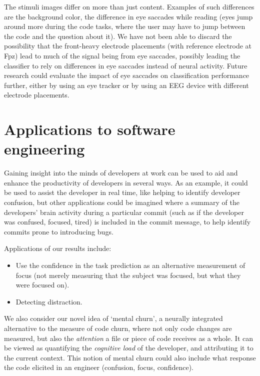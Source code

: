     The stimuli images differ on more than just content. Examples of such differences are the background color, the difference in eye saccades while reading (eyes jump around more during the code tasks, where the user may have to jump between the code and the question about it). We have not been able to discard the possibility that the front-heavy electrode placements (with reference electrode at Fpz) lead to much of the signal being from eye saccades, possibly leading the classifier to rely on differences in eye saccades instead of neural activity. Future research could evaluate the impact of eye saccades on classification performance further, either by using an eye tracker or by using an EEG device with different electrode placements.


\section{Applications to software engineering}

Gaining insight into the minds of developers at work can be used to aid and enhance the productivity of developers in several ways. As an example, it could be used to assist the developer in real time, like helping to identify developer confusion, but other applications could be imagined where a summary of the developers' brain activity during a particular commit (such as if the developer was confused, focused, tired) is included in the commit message, to help identify commits prone to introducing bugs.


Applications of our results include:

\begin{itemize}
    \item Use the confidence in the task prediction as an alternative measurement of focus (not merely measuring that the subject was focused, but what they were focused on). 
    \item Detecting distraction.
\end{itemize}

We also consider our novel idea of `mental churn', a neurally integrated alternative to the measure of code churn, where not only code changes are measured, but also the \emph{attention} a file or piece of code receives as a whole. It can be viewed as quantifying the \emph{cognitive load} of the developer, and attributing it to the current context. This notion of mental churn could also include what response the code elicited in an engineer (confusion, focus, confidence).

